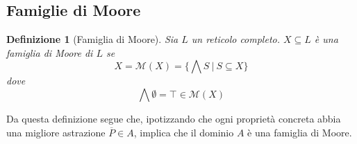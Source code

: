 \documentclass[a4paper, 11pt]{article}
\newtheorem{definit}{Definizione}[subsection]
\begin{document}
	\subsection{Famiglie di Moore}
	\begin{definit}[Famiglia di Moore]
		Sia $L$ un reticolo completo. $X \subseteq L$ è una famiglia di Moore di $L$ se \[ X = \mathcal{M}(X) = \Big\{ \bigwedge S\ \vert\ S \subseteq X \Big\} \] dove \[ \bigwedge \emptyset = \top \in \mathcal{M}(X) \]
	\end{definit}
	
	Da questa definizione segue che, ipotizzando che ogni proprietà concreta abbia una migliore astrazione $\overline{P} \in A$, implica che il dominio $A$ è una famiglia di Moore.
	
\end{document}
